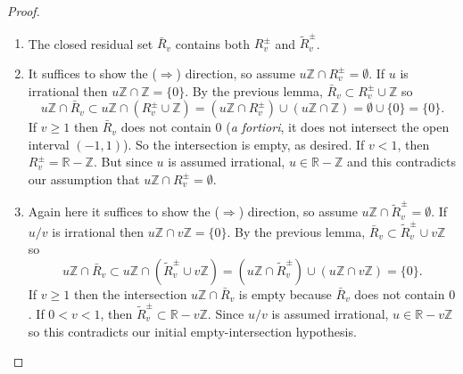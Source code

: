 \documentclass[12pt,letterpaper, reqno]{amsart}
\theoremstyle{definition}
\theoremstyle{remark}
\newcommand{\RR}{\ensuremath{\mathbb{R}}}
\newcommand{\ZZ}{\ensuremath{\mathbb{Z}}}
\begin{document}
\begin{proof}
\begin{enumerate}
\item The closed residual set $\bar{R}_v$ contains both $R_v^\pm$ and $\widetilde{R}_{v}^\pm$.
\item It suffices to show the ($\Rightarrow$) direction, so assume $u\ZZ\cap R_v^\pm=\emptyset$. 
If $u$ is irrational then $u\ZZ\cap \ZZ = \{0\}$.
By the previous lemma, $\bar{R}_v \subset R_v^\pm \cup \ZZ$ so
\[ u\ZZ\cap \bar{R}_v \subset u\ZZ\cap ( R_v^\pm \cup \ZZ) = (u\ZZ\cap R_v^\pm) \cup (u\ZZ\cap\ZZ) = \emptyset \cup \{0\} = \{ 0\}.\]
If $v\geq 1$ then $ \bar{R}_v$ does not contain $0$ ({\em a fortiori}, it does not intersect the open interval $(-1,1)$). So the intersection is empty, as desired. If $v<1$, then $R_v^\pm = \RR-\ZZ$. But since $u$ is assumed irrational, $u\in \RR-\ZZ$ and this contradicts our assumption that $u\ZZ\cap R_v^\pm=\emptyset$.
\item Again here it suffices to show the ($\Rightarrow$) direction, so assume $u\ZZ\cap \widetilde{R}_{v}^\pm=\emptyset$. If $u/v$ is irrational then $u\ZZ\cap v\ZZ = \{0\}$. By the previous lemma, $\bar{R}_v \subset \widetilde{R}_{v}^\pm \cup v\ZZ$ so
\[ u\ZZ\cap \bar{R}_v \subset u\ZZ\cap ( \widetilde{R}_{v}^\pm \cup v\ZZ) = (u\ZZ\cap \widetilde{R}_{v}^\pm) \cup (u\ZZ\cap v\ZZ) = \{0\} .\]
If $v\geq 1$ then the intersection $ u\ZZ\cap \bar{R}_v$ is empty because $\bar{R}_v$ does not contain $0$. If $0<v<1$, then $\widetilde{R}_{v}^\pm \subset \RR - v\ZZ$. Since $u/v$ is assumed irrational, $u\in \RR - v\ZZ$ so this contradicts our initial empty-intersection hypothesis.
\end{enumerate}
\end{proof}



%
%
\end{document}
